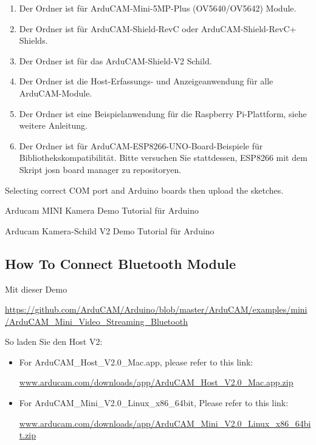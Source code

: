 \begin{enumerate}
  \item Der Ordner  ist für ArduCAM-Mini-5MP-Plus (OV5640/OV5642) Module.
  \item Der Ordner  ist für ArduCAM-Shield-RevC oder ArduCAM-Shield-RevC+ Shields.
  \item Der Ordner  ist für das ArduCAM-Shield-V2 Schild.
  \item Der Ordner  ist die Host-Erfassungs- und Anzeigeanwendung für alle ArduCAM-Module.
  \item Der Ordner  ist eine Beispielanwendung für die Raspberry Pi-Plattform, siehe weitere Anleitung.
  \item Der Ordner  ist für ArduCAM-ESP8266-UNO-Board-Beispiele für Bibliothekskompatibilität. Bitte versuchen Sie stattdessen, ESP8266 mit dem Skript josn board manager zu repositoryen.
\end{enumerate}


Selecting correct COM port and Arduino boards then upload the sketches.

\bigskip

     
Arducam MINI Kamera Demo Tutorial für Arduino

Arducam Kamera-Schild V2 Demo Tutorial für Arduino

\subsection{How To Connect Bluetooth Module}
Mit dieser Demo

\url{https://github.com/ArduCAM/Arduino/blob/master/ArduCAM/examples/mini/ArduCAM_Mini_Video_Streaming_Bluetooth}

So laden Sie den Host V2:

{

\begin{itemize}
  \item For ArduCAM\_Host\_V2.0\_Mac.app, please refer to this link:
  
         \url{www.arducam.com/downloads/app/ArduCAM_Host_V2.0_Mac.app.zip}
  \item For ArduCAM\_Mini\_V2.0\_Linux\_x86\_64bit, Please refer to this link:
       
       \url{www.arducam.com/downloads/app/ArduCAM_Mini_V2.0_Linux_x86_64bit.zip}
\end{itemize}

}

